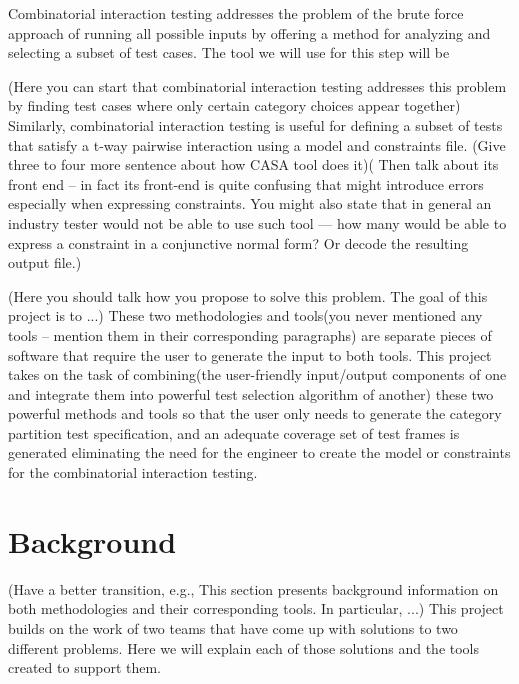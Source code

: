 \documentclass[a4full,12pt]{article}
\newcommand{\eas}[1]{{\color{blue}\sf ({#1})}}
\begin{document}
Combinatorial interaction testing addresses the problem of the brute force approach of running all
  possible inputs by offering a method for analyzing and selecting a subset of test cases. The tool
  we will use for this step will be 


\eas{Here you can start that combinatorial interaction testing addresses this problem by finding test cases where only certain category choices appear together}
 Similarly, combinatorial interaction testing is useful for defining a subset of tests that satisfy a t-way pairwise interaction using a model and constraints file. \eas{Give three to four more sentence about how  CASA tool does it}\eas{ Then talk about its front end -- in fact its front-end is quite confusing that might introduce errors especially when expressing constraints. You might also state that in general an industry tester would not be able to use such tool --- how many would be able to express a constraint in a conjunctive normal form? Or decode the resulting output file.}
 
\eas{Here you should talk how you propose to solve this problem. The goal of this project is to ...} These two methodologies and tools\eas{you never mentioned any tools -- mention them in their corresponding paragraphs} are separate pieces of software that require the user  to generate the input to both tools. This project takes on the task of combining\eas{the user-friendly input/output components of one and integrate them into powerful test selection algorithm of another} these two powerful methods and tools so that the user only needs to generate the category partition test specification, and an adequate coverage set of test frames is generated eliminating the need for the engineer to create the model or constraints for the combinatorial interaction testing.

  
\section{Background}
\eas{Have  a better transition, e.g., This section presents background information on both methodologies and their corresponding tools. In particular, ...}
This project builds on the work of two teams that have come up with solutions to
  two different problems. Here we will explain each of those solutions and the 
  tools created to support them.
\end{document}
